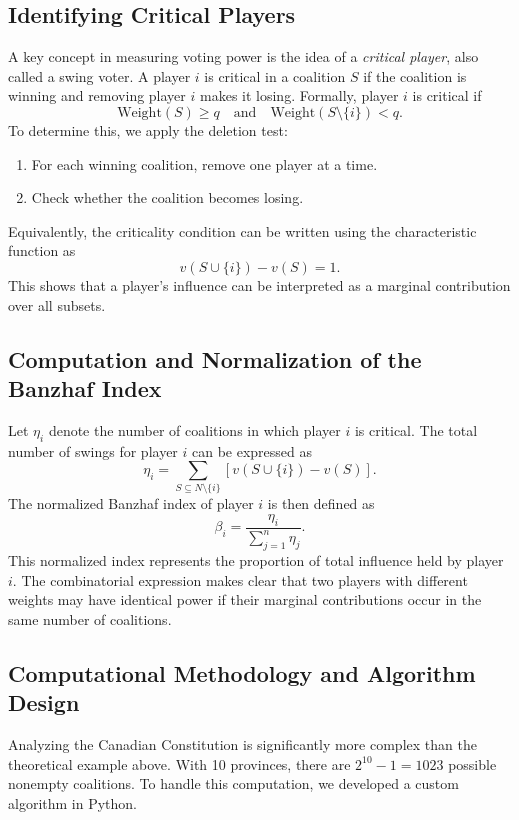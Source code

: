 \documentclass[lettersize,journal]{IEEEtran}
\begin{document}
\subsection{Identifying Critical Players}
A key concept in measuring voting power is the idea of a \emph{critical player}, also called a swing voter. A player $i$ is critical in a coalition $S$ if the coalition is winning and removing player $i$ makes it losing. Formally, player $i$ is critical if
\begin{equation}
\text{Weight}(S)\ge q \quad \text{and} \quad \text{Weight}(S\setminus\{i\})<q.
\end{equation}
To determine this, we apply the deletion test:
\begin{enumerate}
    \item For each winning coalition, remove one player at a time.
    \item Check whether the coalition becomes losing.
\end{enumerate}
Equivalently, the criticality condition can be written using the characteristic function as
\begin{equation}
v(S\cup\{i\})-v(S)=1.
\end{equation}
This shows that a player's influence can be interpreted as a marginal contribution over all subsets.

\subsection{Computation and Normalization of the Banzhaf Index}
Let $\eta_i$ denote the number of coalitions in which player $i$ is critical. The total number of swings for player $i$ can be expressed as
\begin{equation}
\eta_i=\sum_{S\subseteq N\setminus\{i\}} [v(S\cup\{i\})-v(S)].
\end{equation}
The normalized Banzhaf index of player $i$ is then defined as
\begin{equation}
\beta_i=\frac{\eta_i}{\sum_{j=1}^n \eta_j}.
\end{equation}
This normalized index represents the proportion of total influence held by player $i$. The combinatorial expression makes clear that two players with different weights may have identical power if their marginal contributions occur in the same number of coalitions.

\subsection{Computational Methodology and Algorithm Design}
Analyzing the Canadian Constitution is significantly more complex than the theoretical example above. With 10 provinces, there are $2^{10}-1=1023$ possible nonempty coalitions. To handle this computation, we developed a custom algorithm in Python.
\end{document}
